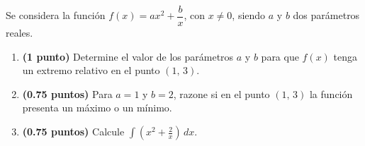 
Se considera la función \(f(x)=ax^2+\dfrac{b}{x}\), con \(x\neq 0\), siendo \(a\) y \(b\) dos parámetros reales.
\begin{enumerate}[label=\alph*),leftmargin=2.4em]
  \item \textbf{(1 punto)} Determine el valor de los parámetros \(a\) y \(b\) para que \(f(x)\) tenga un extremo relativo en el punto \((1,\,3)\).
  \item \textbf{(0.75 puntos)} Para \(a=1\) y \(b=2\), razone si en el punto \((1,\,3)\) la función presenta un máximo o un mínimo.
  \item \textbf{(0.75 puntos)} Calcule \(\displaystyle\int\left(x^2+\frac{2}{x}\right)\,dx\).
\end{enumerate}
